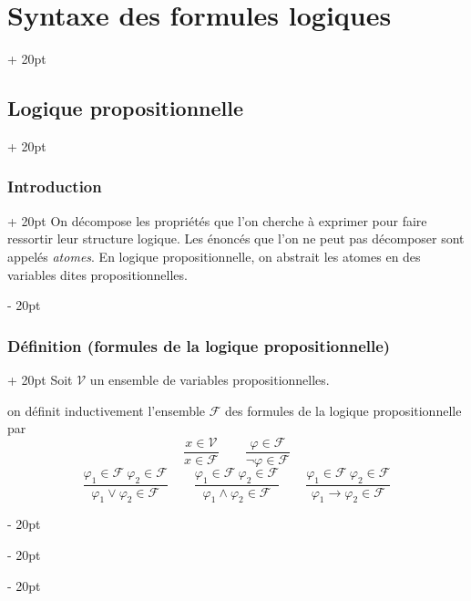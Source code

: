 \documentclass[a4paper, 12pt, twoside]{article}
\newcommand{\ind}[1][20pt]{\advance\leftskip + #1}
\newcommand{\deind}[1][20pt]{\advance\leftskip - #1}
\newenvironment{indt}[2][20pt]{#2 \par \ind[#1]}{\par \deind} %
\begin{document}
    \begin{indt}{\section{Syntaxe des formules logiques}}
        
        \begin{indt}{\subsection{Logique propositionnelle}}
            \begin{indt}{\subsubsection{Introduction}}
                On décompose les propriétés que l'on cherche à exprimer pour faire ressortir leur structure logique. Les énoncés que l'on ne peut pas décomposer sont appelés \textit{atomes}. En logique propositionnelle, on abstrait les atomes en des variables dites propositionnelles.
            \end{indt}
            
            \vspace{12pt}
            
            \begin{indt}{\subsubsection{Définition (formules de la logique propositionnelle)}}
                Soit $\mathcal V$ un ensemble de variables propositionnelles.
                
                on définit inductivement l'ensemble $\mathcal F$ des formules de la logique propositionnelle par
                    \[
                        \dfrac{x \in \mathcal V}{x \in \mathcal F}
                        \qquad
                        \dfrac{\varphi \in \mathcal F}{\neg \varphi \in \mathcal F}
                    \]
                    \[
                        \dfrac{\varphi_1 \in \mathcal F\ \varphi_2 \in \mathcal F}{\varphi_1 \vee \varphi_2 \in \mathcal F}
                        \qquad
                        \dfrac{\varphi_1 \in \mathcal F\ \varphi_2 \in \mathcal F}{\varphi_1 \wedge \varphi_2 \in \mathcal F}
                        \qquad
                        \dfrac{\varphi_1 \in \mathcal F\ \varphi_2 \in \mathcal F}{\varphi_1 \rightarrow \varphi_2 \in \mathcal F}
                    \]
                

\end{indt}
\end{indt}
\end{indt}
\end{document}
